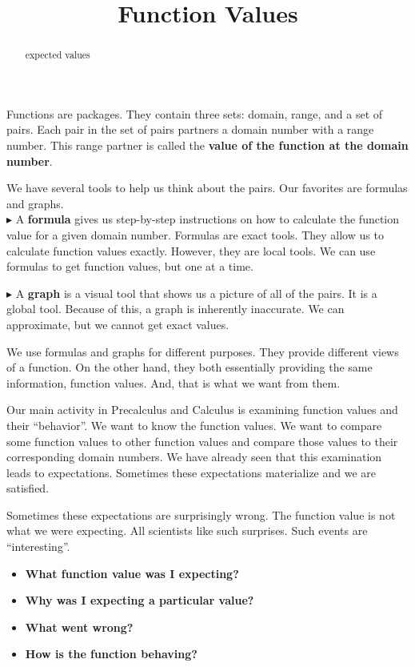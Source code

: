\documentclass{ximera}
\title{Function Values}
\begin{document}
\begin{abstract}
expected values
\end{abstract}
\maketitle




Functions are packages.  They contain three sets: domain, range, and a set of pairs.  Each pair in the set of pairs partners a domain number with a range number.  This range partner is called the \textbf{value of the function \textcolor{purple!85!blue}{at} the domain number}.


We have several tools to help us think about the pairs. Our favorites are formulas and graphs. \\


$\blacktriangleright$ A \textbf{\textcolor{purple!85!blue}{formula}} gives us step-by-step instructions on how to calculate the function value for a given domain number.   Formulas are exact tools. They allow us to calculate function values exactly. However, they are local tools.  We can use formulas to get function values, but one at a time.


$\blacktriangleright$ A \textbf{\textcolor{purple!85!blue}{graph}} is a visual tool that shows us a picture of all of the pairs.  It is a global tool. Because of this, a graph is inherently inaccurate.  We can approximate, but we cannot get exact values.  


We use formulas and graphs for different purposes. They provide different views of a function.  On the other hand, they both essentially providing the same information, function values. And, that is what we want from them.


Our main activity in Precalculus and Calculus is examining function values and their ``behavior''.  We want to know the function values.  We want to compare some function values to other function values and compare those values to their corresponding domain numbers.  We have already seen that this examination leads to expectations.  Sometimes these expectations materialize and we are satisfied.  

Sometimes these expectations are surprisingly wrong.  The function value is not what we were expecting. All scientists like such surprises. Such events are ``interesting''. 

\begin{itemize}
\item  \textbf{\textcolor{blue!75!black}{What function value was I expecting?}}
\item  \textbf{\textcolor{blue!75!black}{Why was I expecting a particular value?}}
\item  \textbf{\textcolor{blue!75!black}{What went wrong?}}
\item  \textbf{\textcolor{blue!75!black}{How is the function behaving?}}
\end{itemize} 
\end{document}
